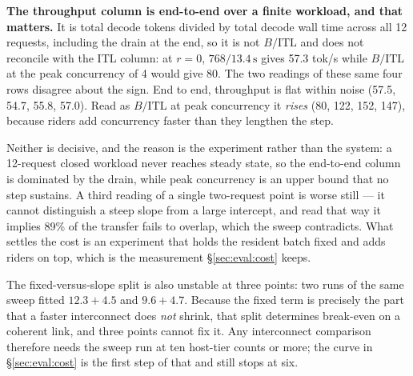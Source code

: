 \textbf{The throughput column is end-to-end over a finite workload, and that
matters.} It is total decode tokens divided by total decode wall time across all
12 requests, including the drain at the end, so it is not $B/\mathrm{ITL}$ and
does not reconcile with the ITL column: at $r{=}0$, $768/13.4\,\mathrm{s}$ gives
57.3 tok/s while $B/\mathrm{ITL}$ at the peak concurrency of 4 would give 80.
The two readings of these same four rows disagree about the sign. End to end,
throughput is flat within noise (57.5, 54.7, 55.8, 57.0). Read as
$B/\mathrm{ITL}$ at peak concurrency it \emph{rises} (80, 122, 152, 147),
because riders add concurrency faster than they lengthen the step.

Neither is decisive, and the reason is the experiment rather than the system: a
12-request closed workload never reaches steady state, so the end-to-end column
is dominated by the drain, while peak concurrency is an upper bound that no step
sustains. A third reading of a single two-request point is worse still --- it
cannot distinguish a steep slope from a large intercept, and read that way it
implies 89\% of the transfer fails to overlap, which the sweep contradicts. What
settles the cost is an experiment that holds the resident batch fixed and adds
riders on top, which is the measurement \S\ref{sec:eval:cost} keeps.

The fixed-versus-slope split is also unstable at three points: two runs of the
same sweep fitted $12.3 + 4.5$ and $9.6 + 4.7$. Because the fixed term is
precisely the part that a faster interconnect does \emph{not} shrink, that
split determines break-even on a coherent link, and three points cannot fix it.
Any interconnect comparison therefore needs the sweep run at ten host-tier
counts or more; the curve in \S\ref{sec:eval:cost} is the first step of that and still stops at
six.
